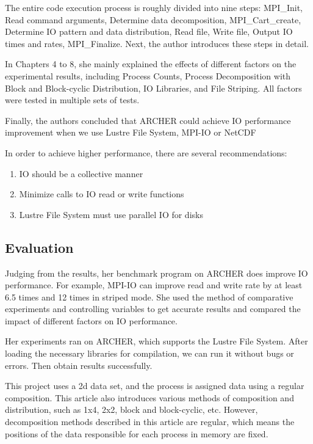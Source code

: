 \documentclass{article}
\begin{document}
The entire code execution process is roughly divided into nine steps: MPI\_Init, Read command arguments, Determine data decomposition, MPI\_Cart\_create, Determine IO pattern and data distribution, Read file, Write file, Output IO times and rates, MPI\_Finalize. Next, the author introduces these steps in detail.

In Chapters 4 to 8, she mainly explained the effects of different factors on the experimental results, including Process Counts, Process Decomposition with Block and Block-cyclic Distribution, IO Libraries, and File Striping. All factors were tested in multiple sets of tests.

Finally, the authors concluded that ARCHER could achieve IO performance improvement when we use Lustre File System, MPI-IO or NetCDF

In order to achieve higher performance, there are several recommendations:

\begin{enumerate}
	\item {IO should be a collective manner}
	\item {Minimize calls to IO read or write functions}
	\item {Lustre File System must use parallel IO for disks}
\end{enumerate}

\subsection{Evaluation}
Judging from the results, her benchmark program on ARCHER does improve IO performance. For example, MPI-IO can improve read and write rate by at least 6.5 times and 12 times in striped mode. She used the method of comparative experiments and controlling variables to get accurate results and compared the impact of different factors on IO performance.

Her experiments ran on ARCHER, which supports the Lustre File System. After loading the necessary libraries for compilation, we can run it without bugs or errors. Then obtain results successfully.

This project uses a 2d data set, and the process is assigned data using a regular composition. This article also introduces various methods of composition and distribution, such as 1x4, 2x2, block and block-cyclic, etc. However, decomposition methods described in this article are regular, which means the positions of the data responsible for each process in memory are fixed.
\end{document}
